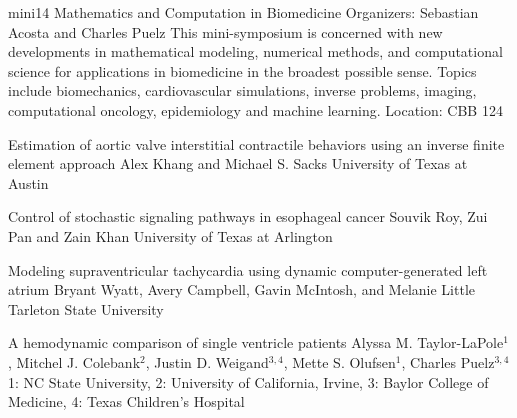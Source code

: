 \mini
{mini14}
{Mathematics and Computation in Biomedicine}
{Organizers: Sebastian Acosta and Charles Puelz}
{This mini-symposium is concerned with new developments in mathematical modeling, numerical methods, and computational science for applications in biomedicine in the broadest possible sense. Topics include biomechanics, cardiovascular simulations, inverse problems, imaging, computational oncology, epidemiology and machine learning.}
{Location: CBB 124}

\begin{talks}
\item\talk
{Estimation of aortic valve interstitial contractile behaviors using an inverse finite element approach}
{Alex Khang and Michael S. Sacks}
{University of Texas at Austin}
\item\talk
{Control of stochastic signaling pathways in esophageal cancer}
{Souvik Roy, Zui Pan and Zain Khan}
{University of Texas at Arlington}
\item\talk
{Modeling supraventricular tachycardia using dynamic computer-generated left atrium}
{Bryant Wyatt, Avery Campbell, Gavin McIntosh, and Melanie Little}
{Tarleton State University}
\item\talk
{A hemodynamic comparison of single ventricle patients}
{Alyssa M. Taylor-LaPole$^{1}$, Mitchel J. Colebank$^{2}$, Justin D. Weigand$^{3,4}$, Mette S. Olufsen$^{1}$, Charles Puelz$^{3,4}$}
{1: NC State University, 2: University of California, Irvine, 3: Baylor College of Medicine, 4: Texas Children’s Hospital}
\end{talks}
\room
